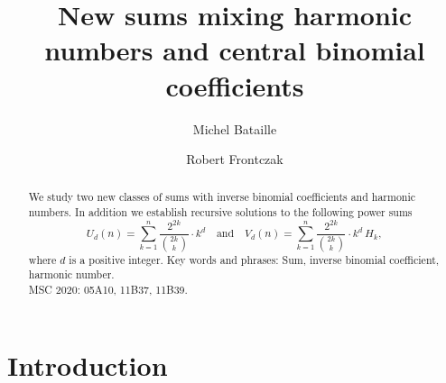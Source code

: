 \documentclass[11pt,reqno]{amsart}
\theoremstyle{plain}
\numberwithin{equation}{section}
\begin{document}
\setcounter{page}{1}

\title[New sums mixing harmonic numbers and central binomial coefficients]
{New sums mixing harmonic numbers and central binomial coefficients}
%
\author{Michel Bataille}
\address{Independent Researcher, 76520 Franqueville-Saint-Pierre, France}
%
\medskip
%
\author{Robert Frontczak}
\address{Independent Researcher, 72764 Reutlingen, Germany}
%

\begin{abstract}
We study two new classes of sums with inverse binomial coefficients and harmonic numbers. In addition we establish recursive
solutions to the following power sums
\begin{equation*}
U_d(n) = \sum_{k=1}^n \frac{2^{2k}}{\binom{2k}{k}} \cdot k^d \quad \mbox{and}\quad  
V_d(n) = \sum_{k=1}^n \frac{2^{2k}}{\binom{2k}{k}}\cdot k^d\,H_k,
\end{equation*}
where $d$ is a positive integer.
\bigskip
\newline
{\sc Key words and phrases}: Sum, inverse binomial coefficient, harmonic number.
\\
{\sc MSC 2020}: 05A10, 11B37, 11B39.  
\end{abstract}


\maketitle


\section{Introduction}
\end{document}
